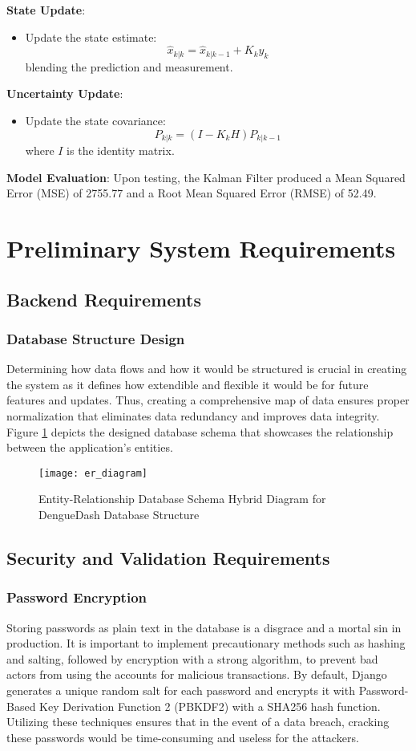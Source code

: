 \textbf{State Update}:
\begin{itemize}
	\item Update the state estimate:
	\[
	\hat{x}_{k|k} = \hat{x}_{k|k-1} + K_k y_k
	\]
	blending the prediction and measurement.
\end{itemize}

\textbf{Uncertainty Update}:
\begin{itemize}
	\item Update the state covariance:
	\[
	P_{k|k} = (I - K_k H) P_{k|k-1}
	\]
	where \( I \) is the identity matrix.
\end{itemize}

\textbf{Model Evaluation}:
Upon testing, the Kalman Filter produced a Mean Squared Error (MSE) of 2755.77 and a Root Mean Squared Error (RMSE) of 52.49.

\clearpage
\section{Preliminary System Requirements}
\subsection{Backend Requirements}
\subsubsection{Database Structure Design}
Determining how data flows and how it would be structured is crucial in creating the system as it defines how extendible and flexible it would be for future features and updates. Thus, creating a comprehensive map of data ensures proper normalization that eliminates data redundancy and improves data integrity. Figure \ref{fig:er_diagram} depicts the designed database schema that showcases the relationship between the application's entities. 
\begin{figure}[H]
	\centering
	\texttt{[image: er\_diagram]}
	\caption{Entity-Relationship Database Schema Hybrid Diagram for DengueDash Database Structure}
	\label{fig:er_diagram}
\end{figure}

\subsection{Security and Validation Requirements}
\subsubsection{Password Encryption}
Storing passwords as plain text in the database is a disgrace and a mortal sin in production. It is important to implement precautionary methods such as hashing and salting, followed by encryption with a strong algorithm, to prevent bad actors from using the accounts for malicious transactions. By default, Django generates a unique random salt for each password and encrypts it with Password-Based Key Derivation Function 2 (PBKDF2) with a SHA256 hash function. Utilizing these techniques ensures that in the event of a data breach, cracking these passwords would be time-consuming and useless for the attackers. 

